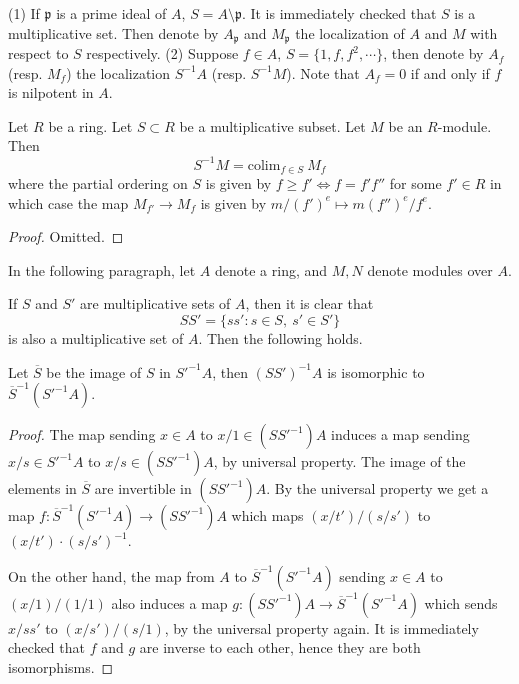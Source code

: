 \begin{example}
\label{example-localize-at-prime}
(1) If $\mathfrak p$ is a prime ideal of $A$, $S = A\setminus\mathfrak p$. It is
immediately checked that $S$ is a multiplicative set. Then denote by
$A_\mathfrak p$ and $M_\mathfrak p$ the localization of $A$ and $M$ with
respect to
$S$ respectively.
(2) Suppose $f\in A$, $S = \{1, f, f^2, \cdots\}$, then denote by $A_f$
(resp. $M_f$) the localization $S^{-1}A$ (resp. $S^{-1}M$). Note
that $A_f = 0$ if and only if $f$ is nilpotent in $A$.
\end{example}

\begin{lemma}
\label{lemma-localization-colimit}
Let $R$ be a ring.
Let $S \subset R$ be a multiplicative subset.
Let $M$ be an $R$-module.
Then
$$
S^{-1}M = \text{colim}_{f \in S}\ M_f
$$
where the partial ordering on $S$ is given by
$f \geq f' \Leftrightarrow f = f'f''$ for some $f' \in R$
in which case the map $M_{f'} \to M_f$ is given
by $m/(f')^e \mapsto m(f'')^e/f^e$.
\end{lemma}

\begin{proof}
Omitted.
\end{proof}

\noindent
In the following paragraph,
let $A$ denote a ring,
and $M, N$ denote modules over $A$.

\medskip\noindent
If $S$ and $S'$ are multiplicative sets of $A$, then it is
clear that
$$
SS' = \{ss' : s\in S, \ s'\in S'\}
$$
is also a multiplicative set of $A$. Then the following holds.

\begin{proposition}
\label{proposition-localize-twice}
Let $\overline{S}$ be the image of $S$ in $S'^{-1}A$, then
$(SS')^{-1}A$ is isomorphic to $\overline{S}^{-1}(S'^{-1}A)$.
\end{proposition}

\begin{proof}
The map sending $x\in A$ to $x/1\in (SS'^{-1})A$ induces a map
sending $x/s\in S'^{-1}A$ to $x/s \in (SS'^{-1})A$, by universal
property. The image of the elements in $\overline{S}$ are invertible
in $(SS'^{-1})A$. By the universal property we get a map
$f : \overline{S}^{-1}(S'^{-1}A)\rightarrow (SS'^{-1})A$ which maps
$(x/t')/(s/s')$ to $(x/t')\cdot(s/s')^{-1}$.

\medskip\noindent
On the other hand, the map from $A$ to $\overline{S}^{-1}(S'^{-1}A)$
sending $x\in A$ to $(x/1)/(1/1)$ also induces a map
$g : (SS'^{-1})A\rightarrow \overline{S}^{-1}(S'^{-1}A)$ which sends $x/ss'$
to $(x/s')/(s/1)$, by the universal property again. It is
immediately checked that $f$ and $g$ are inverse to each other,
hence they are both isomorphisms.
\end{proof}

